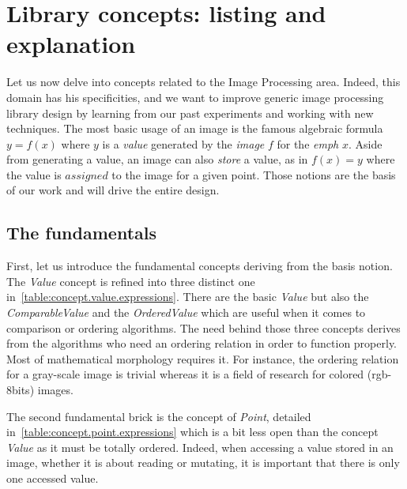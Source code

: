 \section{Library concepts: listing and explanation}
\label{sec:library.concepts}

Let us now delve into concepts related to the Image Processing area. Indeed, this domain has his specificities, and we
want to improve generic image processing library design by learning from our past experiments and working with new
techniques. The most basic usage of an image is the famous algebraic formula $y = f(x)$ where $y$ is a \emph{value}
generated by the \emph{image} $f$ for the \emph{emph} $x$. Aside from generating a value, an image can also \emph{store}
a value, as in $f(x) = y$ where the value is $assigned$ to the image for a given point. Those notions are the basis of
our work and will drive the entire design.

\subsection{The fundamentals}

\label{subsec:fundamentals}

First, let us introduce the fundamental concepts deriving from the basis notion. The \emph{Value} concept is refined
into three distinct one in~\cref{table:concept.value.expressions}. There are the basic \emph{Value} but also the
\emph{ComparableValue} and the \emph{OrderedValue} which are useful when it comes to comparison or ordering algorithms.
The need behind those three concepts derives from the algorithms who need an ordering relation in order to function
properly. Most of mathematical morphology requires it. For instance, the ordering relation for a gray-scale image is
trivial whereas it is a field of research for colored (rgb-8bits) images.

The second fundamental brick is the concept of \emph{Point}, detailed in~\cref{table:concept.point.expressions} which is
a bit less open than the concept \emph{Value} as it must be totally ordered. Indeed, when accessing a value stored in an
image, whether it is about reading or mutating, it is important that there is only one accessed value.

